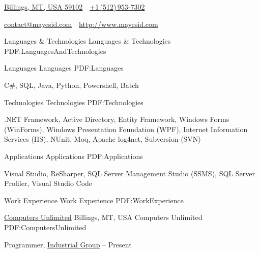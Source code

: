 \documentclass[letterpaper,MMMyyyy,nonstopmode]{simpleresumecv}
\newcommand{\CVAuthor}{Isaac Mayes}
\newcommand{\CVWebpage}{http://www.mayesid.com}
\begin{document}

\Title{\CVAuthor}

\begin{SubTitle}
\href{https://www.google.com/maps/place/Billings,+MT/}
{Billings, MT, USA 59102}
\,\SubBulletSymbol\,
\href{tel:+15129537302}
{+1\,(512)\,953-7302}
\par
\href{mailto:contact@mayesid.com}
{contact@mayesid.com}
\,\SubBulletSymbol\,
\href{\CVWebpage}
{\url{\CVWebpage}}
\end{SubTitle}

\begin{Body}


\Section
{Languages \& \newline Technologies}
{Languages \& Technologies}
{PDF:LanguagesAndTechnologies}

\SubSection
{Languages}
{Languages}
{PDF:Languages}

\BulletItem
C\#, SQL, Java, Python, Powershell, Batch

\Gap

\SubSection
{Technologies}
{Technologies}
{PDF:Technologies}

\BulletItem
.NET Framework, Active Directory, Entity Framework, Windows Forms (WinForms), Windows Presentation Foundation (WPF), Internet Information Services (IIS), NUnit, Moq, Apache log4net, Subversion (SVN)

\Gap

\SubSection
{Applications}
{Applications}
{PDF:Applications}

\BulletItem
Visual Studio, ReSharper, SQL Server Management Studio (SSMS), SQL Server Profiler, Visual Studio Code


\Section
{Work \newline Experience}
{Work Experience}
{PDF:WorkExperience}

\SubSection
{\href{http://www.cu.net}
{Computers Unlimited}
\hfill Billings, MT, USA}
{Computers Unlimited}
{PDF:ComputersUnlimited}

\Entry
Programmer,
\href{http://www.cu.net/industrial}
{Industrial Group}
\hfill
{} --
Present
\begin{Detail}
\end{Detail}

\Gap


\end{Body}
\end{document}
